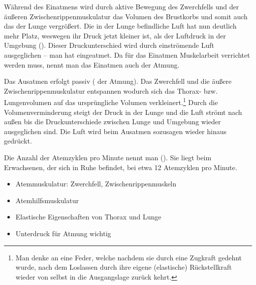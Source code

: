 {Während des Einatmens wird durch aktive Bewegung des
Zwerchfells und der äußeren Zwischenrippenmuskulatur das
Volumen des Brustkorbs und somit auch das der Lunge
vergrößert. Die in der Lunge befindliche Luft hat nun
deutlich mehr Platz, weswegen ihr Druck jetzt kleiner ist,
als der Luftdruck in der Umgebung (). Dieser
Druckunterschied wird durch einströmende Luft ausgeglichen
-- man hat eingeatmet.
Da für das Einatmen Muskelarbeit verrichtet werden muss,
nennt man das Einatmen auch  der Atmung.

Das Ausatmen erfolgt passiv ( der Atmung).
Das Zwerchfell und die äußere Zwischenrippenmuskulatur
entspannen wodurch sich das Thorax- bzw.
Lungenvolumen auf das ursprüngliche Volumen
verkleinert.\footnote{Man denke an eine Feder, welche
nachdem sie durch eine Zugkraft gedehnt wurde, nach dem
Loslassen durch ihre eigene (elastische) Rückstellkraft
wieder von selbst in die Ausgangslage zurück kehrt.} Durch
die Volumenverminderung steigt der Druck in der Lunge und
die Luft strömt nach außen bis die Druckunterschiede
zwischen Lunge und Umgebung wieder ausgeglichen sind. Die
Luft wird beim Ausatmen sozusagen wieder hinaus gedrückt.

Die Anzahl der Atemzyklen pro Minute nennt man 
(). Sie liegt beim Erwachsenen, der sich in Ruhe befindet,
bei etwa 12 Atemzyklen pro Minute.

% 
}
{
\begin{itemize}
  \item Atemmuskulatur: Zwerchfell, Zwischenrippenmuskeln
  \item Atemhilfsmuskulatur
  \item Elastische Eigenschaften von Thorax und Lunge
  \item Unterdruck für Atmung wichtig
\end{itemize}
}{}{}{}

